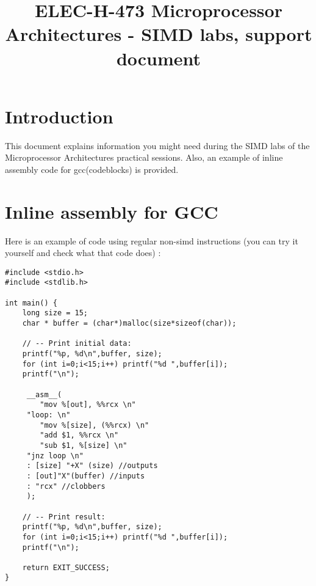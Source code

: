 \documentclass{article}
\title{ELEC-H-473 Microprocessor Architectures - SIMD labs, support document}
\date{\version}
\begin{document}
\maketitle

\section{Introduction}

This document explains information you might need
during the SIMD labs of the Microprocessor Architectures practical sessions.
Also, an example of inline assembly code for gcc(codeblocks) is provided.

\section{Inline assembly for GCC}
Here is an example of code using regular non-simd instructions
(you can try it yourself and check what that code does) :
\begin{verbatim}
#include <stdio.h>
#include <stdlib.h>

int main() {
    long size = 15;
    char * buffer = (char*)malloc(size*sizeof(char));
   
    // -- Print initial data:
    printf("%p, %d\n",buffer, size);
    for (int i=0;i<15;i++) printf("%d ",buffer[i]);
    printf("\n");

     __asm__(
        "mov %[out], %%rcx \n"
     "loop: \n"
        "mov %[size], (%%rcx) \n"
        "add $1, %%rcx \n"
        "sub $1, %[size] \n"
     "jnz loop \n"
     : [size] "+X" (size) //outputs
     : [out]"X"(buffer) //inputs
     : "rcx" //clobbers
     );

    // -- Print result:
    printf("%p, %d\n",buffer, size);
    for (int i=0;i<15;i++) printf("%d ",buffer[i]);
    printf("\n");

    return EXIT_SUCCESS;
}
\end{verbatim}
\end{document}
